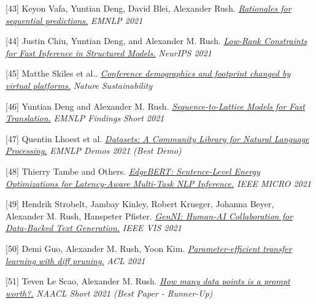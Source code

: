 \documentclass[10pt]{article}
\begin{document}
\medskip


[43] \ind Keyon Vafa, Yuntian Deng, David Blei, Alexander Rush. \emph{\href{ https://arxiv.org/pdf/2109.06387 }{ Rationales for sequential predictions.} }\emph{ EMNLP 2021 }

\medskip


[44] \ind Justin Chiu, Yuntian Deng, and Alexander M. Rush. \emph{\href{ https://proceedings.neurips.cc/paper/2021/file/16c0d78ef6a76b5c247113a4c9514059-Paper.pdf }{ Low-Rank Constraints for Fast Inference in Structured Models.} }\emph{ NeurIPS 2021 }

\medskip


[45] \ind Matthe Skiles et al.. \emph{\href{ https://www.nature.com/articles/s41893-021-00823-2 }{ Conference demographics and footprint changed by virtual platforms.} }\emph{ Nature Sustainability }

\medskip


[46] \ind Yuntian Deng and Alexander M. Rush. \emph{\href{ https://aclanthology.org/2021.findings-emnlp.318.pdf }{ Sequence-to-Lattice Models for Fast Translation.} }\emph{ EMNLP Findings Short 2021 }

\medskip


[47] \ind Quentin Lhoest et al. \emph{\href{ https://arxiv.org/pdf/2109.02846.pdf }{ Datasets: A Community Library for Natural Language Processing.} }\emph{ EMNLP Demos 2021 (Best Demo) }

\medskip


[48] \ind Thierry Tambe and Others. \emph{\href{ https://arxiv.org/pdf/2011.14203.pdf }{ EdgeBERT: Sentence-Level Energy Optimizations for Latency-Aware Multi-Task NLP Inference.} }\emph{ IEEE MICRO 2021 }

\medskip


[49] \ind Hendrik Strobelt, Jambay Kinley, Robert Krueger, Johanna Beyer, Alexander M. Rush, Hanspeter Pfister. \emph{\href{ None }{ GenNI: Human-AI Collaboration for Data-Backed Text Generation.} }\emph{ IEEE VIS 2021 }

\medskip


[50] \ind Demi Guo, Alexander M. Rush, Yoon Kim. \emph{\href{ https://arxiv.org/pdf/2012.07463.pdf }{ Parameter-efficient transfer learning with diff pruning.} }\emph{ ACL 2021 }

\medskip


[51] \ind Teven Le Scao, Alexander M. Rush. \emph{\href{ https://aclanthology.org/2021.naacl-main.208.pdf }{ How many data points is a prompt worth?.} }\emph{ NAACL Short 2021 (Best Paper - Runner-Up) }
\end{document}
